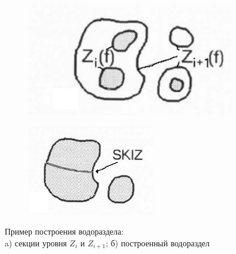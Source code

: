 \documentclass[t]{beamer}
\begin{document}
\begin{frame}[noframenumbering]
		\vspace*{0.7cm}	\vspace*{0.7cm}
	\begin{figure}[h!]
		\begin{subfigure}{.28\textwidth}
			\centering
			\includegraphics[width = 1\textwidth]{image/chapter_2/SKIZ_Watershed_build1}
			\caption{}
		\end{subfigure}
		\begin{subfigure}{.20\textwidth}
			\centering
			\includegraphics[width = \textwidth]{image/chapter_2/SKIZ_Watershed_build2}
			\caption{}
		\end{subfigure}
		\centering
		\caption{Пример построения водораздела:\\ a) секции уровня $Z_i$ и $Z_{i+1}$; б) построенный водораздел}
		\label{fig:SKIZ_Watershed_build}
	\end{figure}
\end{frame}
\end{document}
